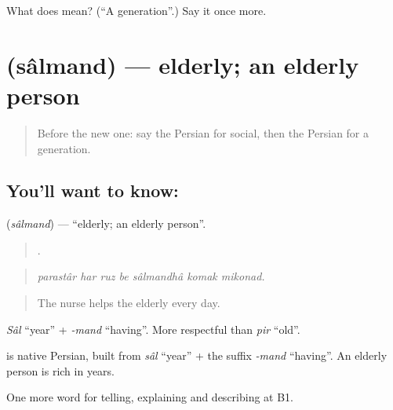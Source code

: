 \begin{tcolorbox}[breakable,colback=teal!4,colframe=teal!35!black,title={Before you move on}]
What does  mean? (\textquotedblleft{}A generation\textquotedblright{}.) Say it once more.
\end{tcolorbox}
\section[\texorpdfstring{\fa{سالمند} (sâlmand)}{سالمند (sâlmand)}]{ (sâlmand) — elderly; an elderly person}

\label{lesson:FA-C385-salmand}



\begin{quote}
Before the new one: say the Persian for social, then the Persian for a generation.
\end{quote}

\subsection*{You'll want to know: }
\textbf{} (\emph{sâlmand}) — \textquotedblleft{}elderly; an elderly person\textquotedblright{}.

\begin{quote}
      .
\end{quote}

\begin{quote}
\emph{parastâr har ruz be sâlmandhâ komak mikonad.}
\end{quote}

\begin{quote}
The nurse helps the elderly every day.
\end{quote}

\emph{Sâl} \textquotedblleft{}year\textquotedblright{} + \emph{-mand} \textquotedblleft{}having\textquotedblright{}. More respectful than \emph{pir} \textquotedblleft{}old\textquotedblright{}.

\begin{cousinweb}
\textbf{} is native Persian, built from \emph{sâl} \textquotedblleft{}year\textquotedblright{} + the suffix \emph{-mand} \textquotedblleft{}having\textquotedblright{}. An elderly person is rich in years.
\end{cousinweb}

\begin{grammarlens}[title={What you've built}]
One more word for telling, explaining and describing at B1.
\end{grammarlens}


